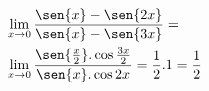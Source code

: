 \begin{ex}
\begin{align}
&\lim_{x\rightarrow 0} \frac{\sen{x}-\sen{2x}}{\sen{x}-\sen{3x}}=\nonumber\\
&\lim_{x\rightarrow 0} \frac{\sen{\frac{x}{2}}.\cos{\frac{3x}{2}}}{\sen{x}.\cos{2x}}=\frac{1}{2}.1=\frac{1}{2}\nonumber
\end{align}
\end{ex}